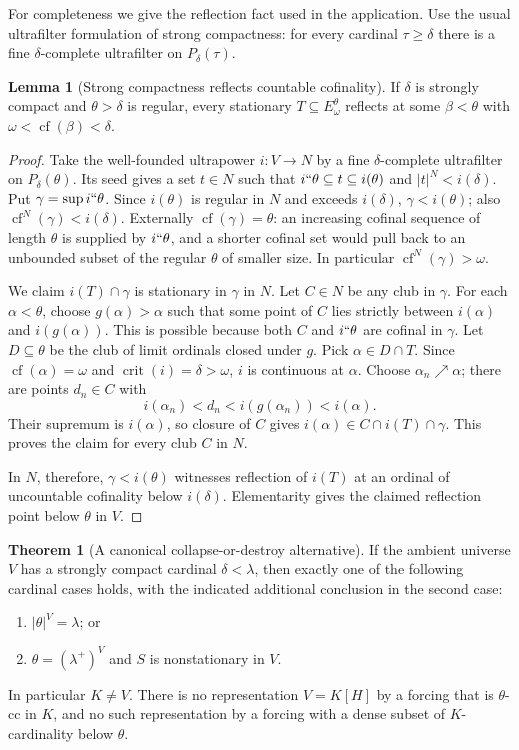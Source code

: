 \documentclass[11pt,letterpaper]{article}
\theoremstyle{definition}
\newtheorem{theorem}[definition]{Theorem}
\newtheorem{lemma}[definition]{Lemma}
\numberwithin{equation}{section}
\newcommand{\crit}{\operatorname{crit}}
\newcommand{\cf}{\operatorname{cf}}
\begin{document}
For completeness we give the reflection fact used in the application.
Use the usual ultrafilter formulation of strong compactness: for every
cardinal $\tau\ge\delta$ there is a fine $\delta$-complete ultrafilter
on $P_\delta(\tau)$.

\begin{lemma}[Strong compactness reflects countable cofinality]\label{lem:sc}
If $\delta$ is strongly compact and $\theta>\delta$ is regular, every
stationary $T\subseteq E_\omega^\theta$ reflects at some
$\beta<\theta$ with $\omega<\cf(\beta)<\delta$.
\end{lemma}

\begin{proof}
Take the well-founded ultrapower $i:V\to N$ by a fine
$\delta$-complete ultrafilter on $P_\delta(\theta)$. Its seed gives a
set $t\in N$ such that $i``\theta\subseteq t\subseteq i(\theta)$ and
$|t|^N<i(\delta)$. Put $\gamma=\sup i``\theta$.
Since $i(\theta)$ is regular in $N$ and exceeds $i(\delta)$,
$\gamma<i(\theta)$; also $\cf^N(\gamma)<i(\delta)$.
Externally $\cf(\gamma)=\theta$: an increasing cofinal sequence of
length $\theta$ is supplied by $i``\theta$, and a shorter cofinal
set would pull back to an unbounded subset of the regular $\theta$
of smaller size. In particular $\cf^N(\gamma)>\omega$.

We claim $i(T)\cap\gamma$ is stationary in $\gamma$ in $N$.
Let $C\in N$ be any club in $\gamma$. For each $\alpha<\theta$, choose
$g(\alpha)>\alpha$ such that some point of $C$ lies strictly between
$i(\alpha)$ and $i(g(\alpha))$. This is possible because both $C$ and
$i``\theta$ are cofinal in $\gamma$.
Let $D\subseteq\theta$ be the club of limit ordinals closed under $g$.
Pick $\alpha\in D\cap T$. Since $\cf(\alpha)=\omega$ and
$\crit(i)=\delta>\omega$, $i$ is continuous at $\alpha$.
Choose $\alpha_n\nearrow\alpha$; there are points
$d_n\in C$ with
\[
 i(\alpha_n)<d_n<i(g(\alpha_n))<i(\alpha).
\]
Their supremum is $i(\alpha)$, so closure of $C$ gives
$i(\alpha)\in C\cap i(T)\cap\gamma$.
This proves the claim for every club $C$ in $N$.

In $N$, therefore, $\gamma<i(\theta)$ witnesses reflection of $i(T)$
at an ordinal of uncountable cofinality below $i(\delta)$.
Elementarity gives the claimed reflection point below $\theta$ in $V$.
\end{proof}

\begin{theorem}[A canonical collapse-or-destroy alternative]\label{thm:gap}
If the ambient universe $V$ has a strongly compact cardinal
$\delta<\lambda$, then exactly one of the following cardinal cases
holds, with the indicated additional conclusion in the second case:
\begin{enumerate}
\item $|\theta|^V=\lambda$; or
\item $\theta=(\lambda^+)^V$ and $S$ is nonstationary in $V$.
\end{enumerate}
In particular $K\ne V$. There is no representation $V=K[H]$ by a
forcing that is $\theta$-cc in $K$, and no such representation by a
forcing with a dense subset of $K$-cardinality below $\theta$.
\end{theorem}
\end{document}
